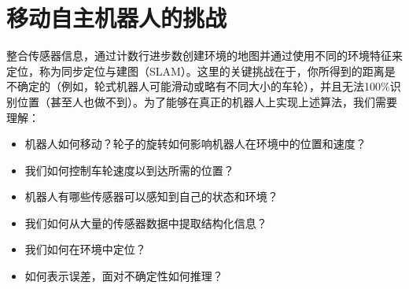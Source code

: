 \section{移动自主机器人的挑战}


整合传感器信息，通过计数行进步数创建环境的地图并通过使用不同的环境特征来定位，称为同步定位与建图（SLAM）。这里的关键挑战在于，你所得到的距离是不确定的（例如，轮式机器人可能滑动或略有不同大小的车轮），并且无法100$\%$识别位置（甚至人也做不到）。为了能够在真正的机器人上实现上述算法，我们需要理解：


\begin{itemize}
\item 机器人如何移动？轮子的旋转如何影响机器人在环境中的位置和速度？
\item 我们如何控制车轮速度以到达所需的位置？
\item 机器人有哪些传感器可以感知到自己的状态和环境？
\item 我们如何从大量的传感器数据中提取结构化信息？
\item 我们如何在环境中定位？
\item 如何表示误差，面对不确定性如何推理？
\end{itemize}

